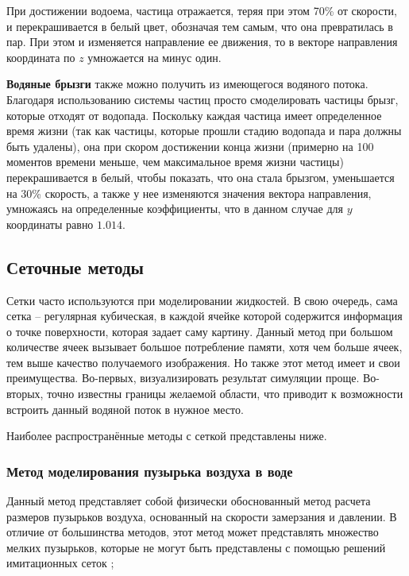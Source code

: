 При достижении водоема, частица отражается, теряя при этом 70\% от скорости, и перекрашивается в белый цвет, обозначая тем самым, что она превратилась в пар. При этом и изменяется направление ее движения, то в векторе направления координата по $z$ умножается на минус один.

\textbf{Водяные брызги} также можно получить из имеющегося водяного потока. Благодаря использованию системы частиц просто смоделировать частицы брызг, которые отходят от водопада. Поскольку каждая частица имеет определенное время жизни (так как частицы, которые прошли стадию водопада и пара должны быть удалены), она при скором достижении конца жизни (примерно на 100 моментов времени меньше, чем максимальное время жизни частицы) перекрашивается в белый, чтобы показать, что она стала брызгом, уменьшается на 30\% скорость, а также у нее изменяются значения вектора направления, умножаясь на определенные коэффициенты, что в данном случае для $y$ координаты равно $1.014$.


\subsection{Сеточные методы}

Сетки часто используются при моделировании жидкостей. В свою очередь, сама сетка -- регулярная кубическая, в каждой ячейке которой содержится информация о точке поверхности, которая задает саму картину. Данный метод при большом количестве ячеек вызывает большое потребление памяти, хотя чем больше ячеек, тем выше качество получаемого изображения. Но также этот метод имеет и  свои преимущества. Во-первых, визуализировать результат симуляции проще. Во-вторых, точно известны границы желаемой области, что приводит к возможности встроить данный водяной поток в нужное место.

Наиболее распространённые методы с сеткой представлены ниже.

\subsubsection{Метод моделирования пузырька воздуха в воде}

Данный метод представляет собой физически обоснованный метод расчета размеров пузырьков воздуха, основанный на скорости замерзания и давлении. В отличие от большинства методов, этот метод может представлять множество мелких пузырьков, которые не могут быть представлены с помощью решений имитационных сеток \cite{bubble-grid};

